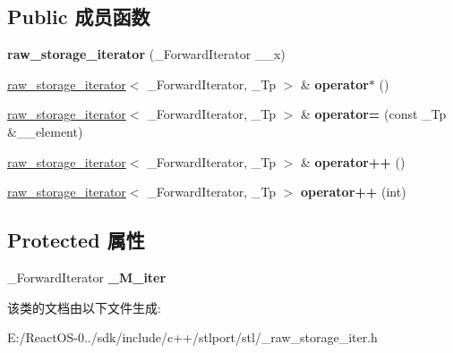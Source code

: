 \subsection*{Public 成员函数}
\begin{DoxyCompactItemize}
\item 
\mbox{\label{classraw__storage__iterator_ac29bd9830f53e5c73308169358b0af58}} 
{\bfseries raw\+\_\+storage\+\_\+iterator} (\+\_\+\+Forward\+Iterator \+\_\+\+\_\+x)
\item 
\mbox{\label{classraw__storage__iterator_a887976e280c4d5abbd36675a87ea0089}} 
\hyperlink{classraw__storage__iterator}{raw\+\_\+storage\+\_\+iterator}$<$ \+\_\+\+Forward\+Iterator, \+\_\+\+Tp $>$ \& {\bfseries operator$\ast$} ()
\item 
\mbox{\label{classraw__storage__iterator_a711f46274ce9ed362bcc8b7ce33c1eae}} 
\hyperlink{classraw__storage__iterator}{raw\+\_\+storage\+\_\+iterator}$<$ \+\_\+\+Forward\+Iterator, \+\_\+\+Tp $>$ \& {\bfseries operator=} (const \+\_\+\+Tp \&\+\_\+\+\_\+element)
\item 
\mbox{\label{classraw__storage__iterator_a67a7224d5a7e57b9624051e5159560f1}} 
\hyperlink{classraw__storage__iterator}{raw\+\_\+storage\+\_\+iterator}$<$ \+\_\+\+Forward\+Iterator, \+\_\+\+Tp $>$ \& {\bfseries operator++} ()
\item 
\mbox{\label{classraw__storage__iterator_aef9252e1378d70bb664810bf09bfe48a}} 
\hyperlink{classraw__storage__iterator}{raw\+\_\+storage\+\_\+iterator}$<$ \+\_\+\+Forward\+Iterator, \+\_\+\+Tp $>$ {\bfseries operator++} (int)
\end{DoxyCompactItemize}
\subsection*{Protected 属性}
\begin{DoxyCompactItemize}
\item 
\mbox{\label{classraw__storage__iterator_a06053f867e32ad5b5f90c98cb304690d}} 
\+\_\+\+Forward\+Iterator {\bfseries \+\_\+\+M\+\_\+iter}
\end{DoxyCompactItemize}


该类的文档由以下文件生成\+:\begin{DoxyCompactItemize}
\item 
E\+:/\+React\+O\+S-\/0../sdk/include/c++/stlport/stl/\+\_\+raw\+\_\+storage\+\_\+iter.\+h\end{DoxyCompactItemize}
